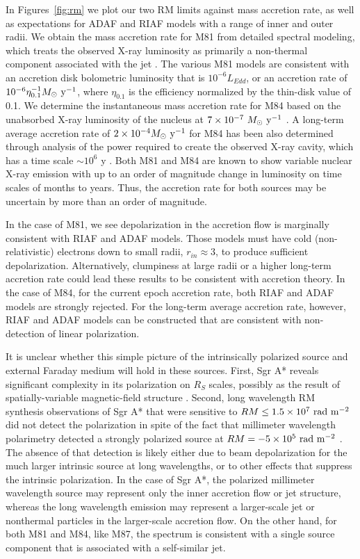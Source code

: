 \documentclass[12pt,preprint]{aastex}
\begin{document}
In Figures~\ref{fig:rm} we plot our two RM limits against mass accretion
rate, as well as expectations for ADAF and RIAF models with a range of inner and outer radii.
We obtain the mass accretion rate for M81 from detailed spectral modeling, which treats
the observed X-ray luminosity as primarily a non-thermal component associated with the jet
\citep{2008ApJ...681..905M}.  The various M81 models are consistent with an accretion disk
bolometric luminosity that is $10^{-6} L_{Edd}$, 
or an accretion rate of $10^{-6} \eta_{0.1}^{-1} M_\odot\ {\rm y^{-1}}$,
where $\eta_{0.1}$ is the efficiency normalized by the thin-disk
value of 0.1.  
We determine the instantaneous 
mass accretion rate for M84 based on the unabsorbed X-ray luminosity of the nucleus at $7 \times 10^{-7}\ M_\odot\ {\rm y^{-1}}$
\citep{2013MNRAS.432..530R}.  A long-term average accretion rate of 
$2 \times 10^{-4}M_\odot\ {\rm y^{-1}}$ 
for M84 has been also determined
through analysis of the power required to create the observed X-ray cavity, which
has a  time scale $\sim 10^6$ y \citep{2006ApJ...652..216R}.  
Both M81 and M84 are known to show variable nuclear X-ray
emission with up to an order of magnitude change in luminosity on time scales of months to years.
Thus, the accretion rate for both sources may be uncertain by more than an order of magnitude.

In the case of M81, we see depolarization in the accretion flow is marginally consistent
with RIAF and ADAF models.  Those models must have cold (non-relativistic) electrons down to small radii, $r_{in} 
\approx 3$, to produce sufficient depolarization.  Alternatively, clumpiness
at large radii or  a higher long-term 
accretion rate could lead these results to be consistent with accretion theory.
In the case of M84, for the current epoch accretion rate, both RIAF and ADAF models are 
strongly rejected.  For the long-term average accretion rate, however, RIAF and ADAF
models can be constructed that are consistent with non-detection of linear polarization.

It is unclear whether this simple picture of the intrinsically polarized source
and external Faraday medium  will hold in these sources.
First, Sgr A* reveals significant complexity in its polarization on $R_S$ scales,
possibly as the result of spatially-variable magnetic-field structure \citep{2015Sci...350.1242J}.
Second, long wavelength RM synthesis observations of Sgr A* that were sensitive to 
$RM \leq 1.5 \times 10^7 {\rm\ rad\ m^{-2}}$
did not detect the polarization in spite of the fact that millimeter wavelength 
polarimetry detected a strongly polarized source at $RM = -5 \times 10^5 {\rm\ rad\ m^{-2}}$ 
\citep{1999ApJ...521..582B}.  The absence of that detection is likely either due to 
beam depolarization for the much larger intrinsic source at long wavelengths, or
to other effects that suppress the intrinsic polarization.  In the case of Sgr A*, 
the polarized millimeter wavelength source may represent only the inner
accretion flow or jet structure, whereas the long wavelength emission may represent a 
larger-scale jet
or nonthermal particles in the larger-scale accretion flow.  On the other hand, for 
both M81 and M84, like M87,
the spectrum is consistent with a single source component that is associated with
a self-similar jet.
\end{document}
